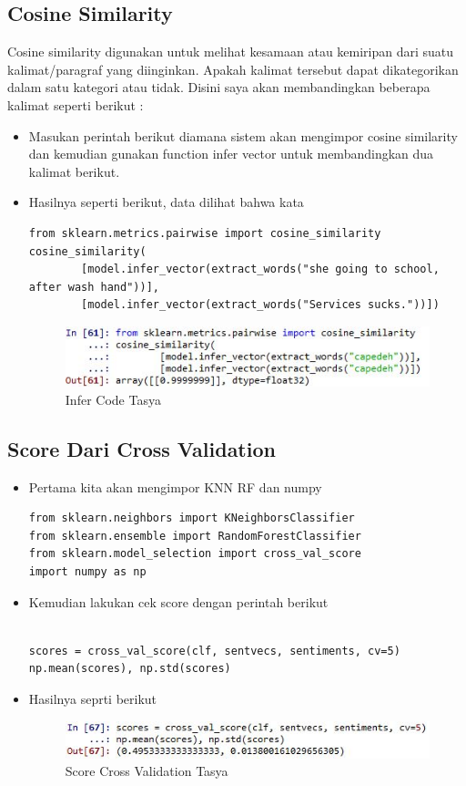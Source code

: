 \subsection{Cosine Similarity}
Cosine similarity digunakan untuk melihat kesamaan atau kemiripan dari suatu kalimat/paragraf yang diinginkan. Apakah kalimat tersebut dapat dikategorikan dalam satu kategori atau tidak.
Disini saya akan membandingkan beberapa kalimat seperti berikut :\\
\begin{itemize}
\item Masukan perintah berikut diamana sistem akan mengimpor cosine similarity dan kemudian gunakan function infer vector untuk membandingkan dua kalimat berikut.
\item Hasilnya seperti berikut, data dilihat bahwa kata 
\begin{verbatim}
from sklearn.metrics.pairwise import cosine_similarity
cosine_similarity(
        [model.infer_vector(extract_words("she going to school, after wash hand"))],
        [model.infer_vector(extract_words("Services sucks."))])
\end{verbatim}
\begin{figure}[ht]
\centering
\includegraphics[scale=0.5]{figures/chapter5tasya27.jpg}
\caption{Infer Code Tasya}
\label{Praktek}
\end{figure}
\end{itemize}

\subsection{Score Dari Cross Validation}
\begin{itemize}
\item Pertama kita akan mengimpor KNN RF dan numpy
\begin{verbatim}
from sklearn.neighbors import KNeighborsClassifier
from sklearn.ensemble import RandomForestClassifier
from sklearn.model_selection import cross_val_score
import numpy as np
\end{verbatim}
\item Kemudian lakukan cek score dengan perintah berikut 
\begin{verbatim}

scores = cross_val_score(clf, sentvecs, sentiments, cv=5)
np.mean(scores), np.std(scores)
\end{verbatim}

\item Hasilnya seprti berikut
\begin{figure}[ht]
\centering
\includegraphics[scale=0.5]{figures/chapter5tasya29.jpg}
\caption{Score Cross Validation Tasya}
\label{Praktek}
\end{figure}
\end{itemize}

